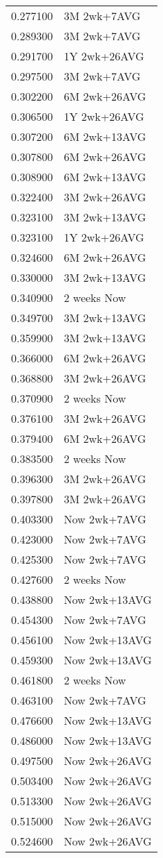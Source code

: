 \begin{tabular}{rl}
0.277100 & 3M 2wk+7AVG \\
0.289300 & 3M 2wk+7AVG \\
0.291700 & 1Y 2wk+26AVG \\
0.297500 & 3M 2wk+7AVG \\
0.302200 & 6M 2wk+26AVG \\
0.306500 & 1Y 2wk+26AVG \\
0.307200 & 6M 2wk+13AVG \\
0.307800 & 6M 2wk+26AVG \\
0.308900 & 6M 2wk+13AVG \\
0.322400 & 3M 2wk+26AVG \\
0.323100 & 3M 2wk+13AVG \\
0.323100 & 1Y 2wk+26AVG \\
0.324600 & 6M 2wk+26AVG \\
0.330000 & 3M 2wk+13AVG \\
0.340900 & 2 weeks Now \\
0.349700 & 3M 2wk+13AVG \\
0.359900 & 3M 2wk+13AVG \\
0.366000 & 6M 2wk+26AVG \\
0.368800 & 3M 2wk+26AVG \\
0.370900 & 2 weeks Now \\
0.376100 & 3M 2wk+26AVG \\
0.379400 & 6M 2wk+26AVG \\
0.383500 & 2 weeks Now \\
0.396300 & 3M 2wk+26AVG \\
0.397800 & 3M 2wk+26AVG \\
0.403300 & Now 2wk+7AVG \\
0.423000 & Now 2wk+7AVG \\
0.425300 & Now 2wk+7AVG \\
0.427600 & 2 weeks Now \\
0.438800 & Now 2wk+13AVG \\
0.454300 & Now 2wk+7AVG \\
0.456100 & Now 2wk+13AVG \\
0.459300 & Now 2wk+13AVG \\
0.461800 & 2 weeks Now \\
0.463100 & Now 2wk+7AVG \\
0.476600 & Now 2wk+13AVG \\
0.486000 & Now 2wk+13AVG \\
0.497500 & Now 2wk+26AVG \\
0.503400 & Now 2wk+26AVG \\
0.513300 & Now 2wk+26AVG \\
0.515000 & Now 2wk+26AVG \\
0.524600 & Now 2wk+26AVG \\
\hline
\end{tabular}